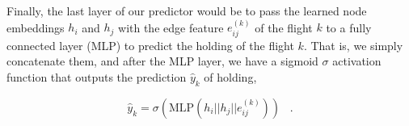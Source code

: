 

Finally, the last layer of our predictor would be to pass the learned
node embeddings $h_i$ and $h_j$ with the edge feature $e_{ij}^{(k)}$
of the flight $k$ to a fully connected layer (MLP) to predict the
holding of the flight $k$.  That is, we simply concatenate them, and
after the MLP layer, we have a sigmoid $\sigma$ activation function that
outputs the prediction $\hat{y}_k$ of holding,

$$ \hat{y}_k = \sigma (\text{MLP}(h_i || h_j || e_{ij}^{(k)})) \; \; \; \text{.} $$
